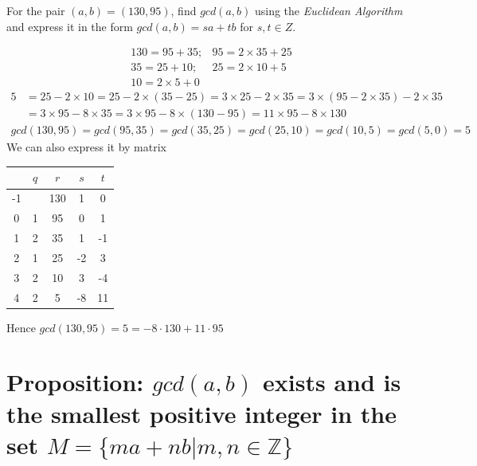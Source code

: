 \documentclass[11pt]{elegantbook}
\begin{document}
\begin{example}[Exercise 1.4.3]
    For the pair $(a,b) = (130, 95)$, find $gcd(a, b)$ using the \textit{Euclidean Algorithm} and express it in the form $gcd(a,b) = sa + tb$ for $s, t \in Z$.
\end{example}
\begin{equation}
    \begin{aligned}
        &130=95+35;
        &95=2\times35+25\\
        &35=25+10;
        &25=2\times10+5\\
        &10=2\times5+0
    \end{aligned}
    \nonumber
\end{equation}
\begin{equation}
    \begin{aligned}
        5&=25-2\times10
        =25-2\times(35-25)
        =3\times25-2\times35=3\times(95-2\times35)-2\times35\\
        &=3\times95-8\times35=3\times95-8\times(130-95)=11\times95-8\times130
    \end{aligned}
    \nonumber
\end{equation}
\begin{equation}
    \begin{aligned}
        gcd(130,95)=gcd(95,35)=gcd(35,25)=gcd(25,10)=gcd(10,5)=gcd(5,0)=5
    \end{aligned}
    \nonumber
\end{equation}
We can also express it by matrix
\begin{center}
    \begin{tabular}{ccccc}
            \hline
            & $q$& $r$&$s$&$t$\\
            \hline
            -1&&130&1&0\\
            0&1&95&0&1\\
            1&2&35&1&-1\\
            2&1&25&-2&3\\
            3&2&10&3&-4\\
            4&2&5&-8&11\\
            \hline
    \end{tabular}
\end{center}
Hence $gcd(130,95)=5=-8\cdot130+11\cdot95$
\section{Proposition: $gcd(a,b)$ exists and is the smallest positive integer in the set $M=\{ma+nb|m,n\in\mathbb{Z}\}$}
\end{document}
